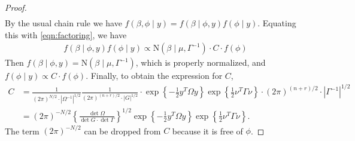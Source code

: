 \documentclass[10pt]{article}
\begin{document}
\begin{proof}
\begin{align}
\end{align}
%
By the usual chain rule we have $f(\beta, \phi \mid y) = f(\beta \mid \phi, y) f(\phi \mid y)$. Equating this with \eqref{eqn:factoring}, we have
%
\begin{align*}
f(\beta \mid \phi, y) f(\phi \mid y) \propto \text{N}(\beta \mid \mu, \Gamma^{-1}) \cdot C \cdot f(\phi)
\end{align*}
%
Then $f(\beta \mid \phi, y) = \text{N}(\beta \mid \mu, \Gamma^{-1})$, which is properly normalized, and $f(\phi \mid y) \propto C \cdot f(\phi)$. Finally, to obtain the expression for $C$,
%
\begin{align*}
C &= \frac{1}{ (2\pi)^{N/2} \cdot |\Omega^{-1}|^{1/2}}
\frac{1}{ (2\pi)^{(n+r)/2} \cdot |G|^{1/2}} \cdot \exp\left\{ -\frac{1}{2} y^T \Omega y \right\} \exp\left\{ \frac{1}{2} \nu^T \Gamma \nu \right\} \cdot (2\pi)^{(n+r)/2} \cdot |\Gamma^{-1}|^{1/2} \\
&= (2\pi)^{-N/2} \left\{ \frac{ \det \Omega }{\det G \cdot \det \Gamma} \right\}^{1/2}
\exp\left\{ -\frac{1}{2} y^T \Omega y \right\} \exp\left\{ \frac{1}{2} \nu^T \Gamma \nu \right\}.
\end{align*}
%
The term $(2\pi)^{-N/2}$ can be dropped from $C$ because it is free of $\phi$.

\end{proof}




%
\end{document}
